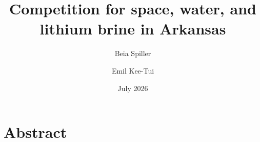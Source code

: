 \documentclass{article}
\begin{document}
\title{Competition for space, water, and lithium brine in Arkansas}

\author[1]{Beia Spiller}
\author[2]{Emil Kee-Tui}

\date{July 2026}
\maketitle

\section{Abstract}




\end{document}
